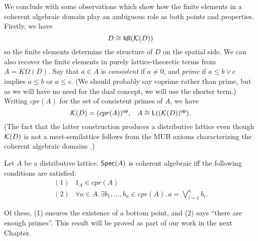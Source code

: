 We conclude with some observations which show how the finite elements in a coherent algebraic domain play an ambiguous role as both points and properties.
Firstly, we have
\[ D \cong {\sf Idl}({\cal K}(D)) \]
so the finite elements determine the structure of $D$ on the spatial side.
We can also recover the finite elements in purely lattice-theoretic terms from $A = K \Omega (D)$.
Say that $a \in A$ is {\it consistent} if $a \not= 0$, and {\it prime} if $a \leq {b \vee c}$ implies $a \leq b$ or $a \leq c$. (We should probably say coprime rather than prime, but as we will have no need for the dual concept, we will use the shorter term.)
Writing $cpr(A)$ for the set of consistent primes of $A$, we have
\begin{equation}
{\cal K}(D) = (cpr(A))^{\sf op}, \;\;\; A \cong {\sf L}(({\cal K}(D))^{\sf op}) . 
\end{equation}
(The fact that the latter construction produces a distributive lattice even 
though ${\cal K}(D)$ is not a meet-semilattice follows from the MUB axioms 
characterizing the coherent algebraic domains \cite[Chapter 8 p.\  41]{PloLN}.)

\begin{theorem}
Let $A$ be a distributive lattice. ${\sf Spec}(A)$ is coherent algebraic iff the following conditions are satisfied:
\[ \begin{array}{rl}
(1) & 1_{A} \in cpr(A) \\
(2) & \forall a \in A. \, \exists b_{1}, \ldots , b_{n} \in cpr(A). \, a = \bigvee_{i=1}^{n} b_{i}. 
\end{array} \]
\end{theorem}
Of these, (1) ensures the existence of a bottom point, and (2) says ``there are enough primes''.
This result will be proved as part of our work in the next Chapter.

